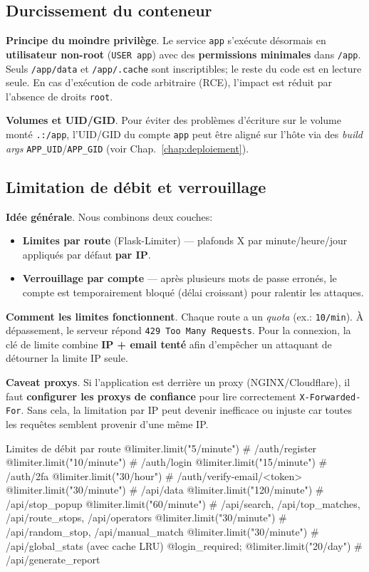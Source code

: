 \subsection*{Durcissement du conteneur}
\noindent \textbf{Principe du moindre privilège}. Le service \texttt{app} s'exécute désormais en \textbf{utilisateur non-root} (\texttt{USER app}) avec des \textbf{permissions minimales} dans \texttt{/app}. Seuls \texttt{/app/data} et \texttt{/app/.cache} sont inscriptibles; le reste du code est en lecture seule. En cas d'exécution de code arbitraire (RCE), l'impact est réduit par l'absence de droits \texttt{root}.

\noindent \textbf{Volumes et UID/GID}. Pour éviter des problèmes d'écriture sur le volume monté \texttt{.:/app}, l'UID/GID du compte \texttt{app} peut être aligné sur l'hôte via des \textit{build args} \texttt{APP\_UID}/\texttt{APP\_GID} (voir Chap.~\ref{chap:deploiement}).

\subsection*{Limitation de débit et verrouillage}
\noindent \textbf{Idée générale}. Nous combinons deux couches:
\begin{itemize}
  \item \textbf{Limites par route} (Flask-Limiter) — plafonds \og X par minute/heure/jour \fg{} appliqués par défaut \textbf{par IP}.
  \item \textbf{Verrouillage par compte} — après plusieurs mots de passe erronés, le compte est temporairement bloqué (délai croissant) pour ralentir les attaques.
\end{itemize}

\noindent \textbf{Comment les limites fonctionnent}. Chaque route a un \emph{quota} (ex.: \texttt{10/min}). À dépassement, le serveur répond \texttt{429 Too Many Requests}. Pour la connexion, la clé de limite combine \textbf{IP + email tenté} afin d'empêcher un attaquant de détourner la limite IP seule.

\noindent \textbf{Caveat proxys}. Si l'application est derrière un proxy (NGINX/Cloudflare), il faut \textbf{configurer les proxys de confiance} pour lire correctement \texttt{X-Forwarded-For}. Sans cela, la limitation \og par IP \fg{} peut devenir inefficace ou injuste car toutes les requêtes semblent provenir d'une même IP.
\begin{codebox}[language=Python]{Limites de débit par route}
@limiter.limit("5/minute")   # /auth/register
@limiter.limit("10/minute")  # /auth/login
@limiter.limit("15/minute")  # /auth/2fa
@limiter.limit("30/hour")    # /auth/verify-email/<token>
@limiter.limit("30/minute")  # /api/data
@limiter.limit("120/minute") # /api/stop_popup
@limiter.limit("60/minute")  # /api/search, /api/top_matches, /api/route_stops, /api/operators
@limiter.limit("30/minute")  # /api/random_stop, /api/manual_match
@limiter.limit("30/minute")  # /api/global_stats (avec cache LRU)
@login_required; @limiter.limit("20/day")  # /api/generate_report
\end{codebox}

